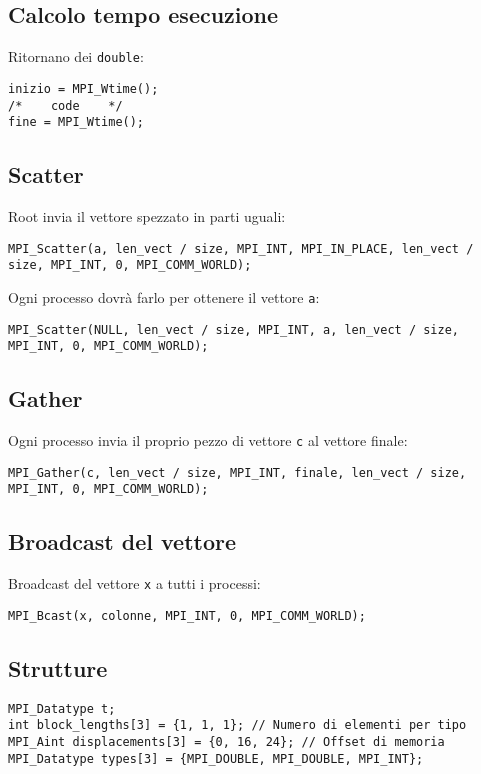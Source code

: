 \documentclass[a4paper,12pt]{article}
\begin{document}
\subsection{Calcolo tempo esecuzione}
Ritornano dei \texttt{double}:
\begin{lstlisting}
inizio = MPI_Wtime();
/*    code    */
fine = MPI_Wtime();
\end{lstlisting}

\subsection{Scatter}
Root invia il vettore spezzato in parti uguali:
\begin{lstlisting}
MPI_Scatter(a, len_vect / size, MPI_INT, MPI_IN_PLACE, len_vect / size, MPI_INT, 0, MPI_COMM_WORLD);
\end{lstlisting}

Ogni processo dovrà farlo per ottenere il vettore \texttt{a}:
\begin{lstlisting}
MPI_Scatter(NULL, len_vect / size, MPI_INT, a, len_vect / size, MPI_INT, 0, MPI_COMM_WORLD);
\end{lstlisting}

\subsection{Gather}
Ogni processo invia il proprio pezzo di vettore \texttt{c} al vettore finale:
\begin{lstlisting}
MPI_Gather(c, len_vect / size, MPI_INT, finale, len_vect / size, MPI_INT, 0, MPI_COMM_WORLD);
\end{lstlisting}

\subsection{Broadcast del vettore}
Broadcast del vettore \texttt{x} a tutti i processi:
\begin{verbatim}
MPI_Bcast(x, colonne, MPI_INT, 0, MPI_COMM_WORLD);
\end{verbatim}

\subsection{Strutture}
\begin{verbatim}
MPI_Datatype t;
int block_lengths[3] = {1, 1, 1}; // Numero di elementi per tipo
MPI_Aint displacements[3] = {0, 16, 24}; // Offset di memoria
MPI_Datatype types[3] = {MPI_DOUBLE, MPI_DOUBLE, MPI_INT};
\end{verbatim}
\end{document}
